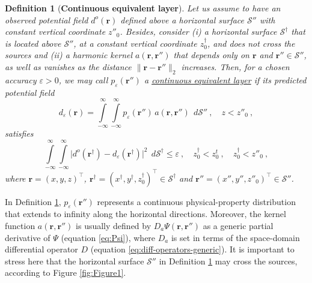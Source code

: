 \documentclass[manuscript,noblind]{geophysics}
\newtheorem{definition}{Definition}
\begin{document}
	\begin{definition}[\textbf{Continuous equivalent layer}]
		Let us assume to have an observed potential field $d^{o}(\mathbf{r})$ defined above 
		a horizontal surface $\mathcal{S}''$ with constant vertical coordinate $z''_{0}$. 
		Besides, consider (i) a horizontal surface $\mathcal{S}^{\dagger}$ that is located above 
		$\mathcal{S}''$, at a constant vertical coordinate $z^{\dagger}_{0}$, 
		and does not cross the sources and (ii) a harmonic kernel 
		$a(\mathbf{r}, \mathbf{r}'')$ that depends only on $\mathbf{r}$ and $\mathbf{r}'' \in \mathcal{S}''$, as well as 
		vanishes as the distance $\| \mathbf{r} - \mathbf{r}'' \|_{2}$ increases. 
		Then, for a chosen accuracy $\varepsilon > 0$, we may call $p_{\varepsilon}(\mathbf{r}'')$ 
		a \underline{continuous equivalent layer} if its predicted potential field 
		\begin{equation}
			d_{\varepsilon}(\mathbf{r})
			= \int\limits_{-\infty}^{\infty}\int\limits_{-\infty}^{\infty}
			p_{\varepsilon}(\mathbf{r}'') \, a(\mathbf{r}, \mathbf{r}'') \:\: d\mathcal{S}''
			\: , \quad z < z''_{0} \: ,
			\label{eq:predicted-data-continuous-layer}
		\end{equation}
		satisfies 
		\begin{equation}
			\int\limits_{-\infty}^{\infty} \int\limits_{-\infty}^{\infty}
			\vert d^{o}(\mathbf{r}^{\dagger}) - 
			d_{\varepsilon}(\mathbf{r}^{\dagger}) \vert^{2}
			\:\: d\mathcal{S}^{\dagger} \le \varepsilon \: ,
			\quad z^{\dagger}_{0} < z^{t}_{0} \: , \quad z^{\dagger}_{0} < z''_{0} \: ,
			\label{eq:epsilon-bound-data}
		\end{equation}
		where $\mathbf{r} = (x, y, z)^{\top}$, 
		$\mathbf{r}^{\dagger} = (x^{\dagger}, y^{\dagger}, z^{\dagger}_{0})^{\top} \in \mathcal{S}^{\dagger}$ 
		and $\mathbf{r}'' = (x'', y'', z''_{0})^{\top} \in \mathcal{S}''$.
		\label{def:continuous-eqlayer}
	\end{definition}
	
	In Definition \ref{def:continuous-eqlayer}, $p_{\varepsilon}(\mathbf{r}'')$ represents a continuous 
	physical-property distribution that extends to infinity along the horizontal directions. 
	Moreover, the kernel function $a(\mathbf{r}, \mathbf{r}'')$ is usually defined by $D_{a} \Psi(\mathbf{r}, \mathbf{r}'')$ 
	as a generic partial derivative of $\Psi$ (equation \ref{eq:Psi}),
	where $D_{a}$ is set in terms of the space-domain differential operator 
	$D$ (equation \ref{eq:diff-operators-generic}).
	It is important to stress here that the horizontal surface $\mathcal{S}''$ in Definition \ref{def:continuous-eqlayer} 
	may cross the sources, according to Figure \ref{fig:Figure1}.
	
\end{document}
